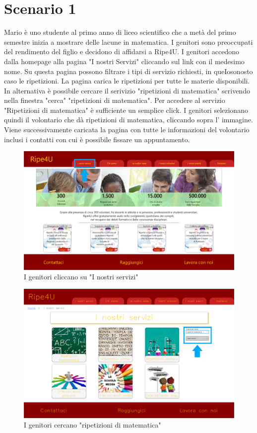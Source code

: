 
    \section{Scenario 1}
    Mario è uno studente al primo anno di liceo scientifico che a metà del primo
    semestre inizia a mostrare delle lacune in matematica. I genitori sono
    preoccupati del rendimento del figlio e decidono di affidarsi a Ripe4U. I
    genitori accedono dalla homepage alla pagina "I nostri Servizi" cliccando
    sul link con il medesimo nome. Su questa pagina possono filtrare i tipi di
    servizio richiesti, in queIosonosto caso le ripetizioni. La pagina carica le
    ripetizioni per tutte le materie disponibili. In alternativa è possibile
    cercare il serivizio "ripetizioni di matematica" scrivendo nella finestra
    "cerca" "ripetizioni di matematica". Per accedere al servizio "Ripetizioni
    di matematica" è sufficiente un semplice click. I genitori selezionano
    quindi il volontario che dà ripetizioni di matematica, cliccando sopra l'
    immagine. Viene successivamente caricata la pagina con tutte le informazioni
    del volontario inclusi i contatti con cui è possibile fissare un
    appuntamento.
    \begin{figure}[H]
        \centering
        \includegraphics[scale=0.25]{resources/images/scenario1-1.png}
        \caption{I genitori cliccano su "I nostri servizi"}
    \end{figure}
    \begin{figure}[H]
        \centering
        \includegraphics[scale=0.25]{resources/images/scenario1-2.png}
        \caption{I genitori cercano "ripetizioni di matematica"}
    \end{figure}
